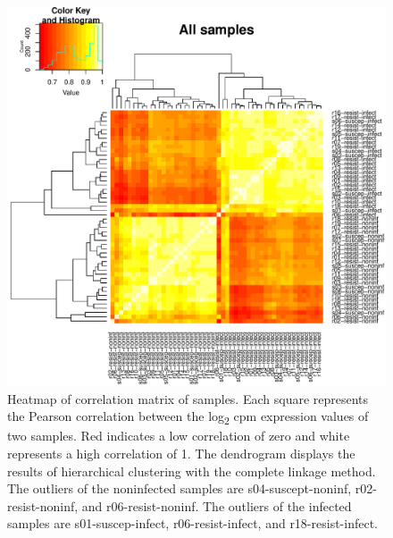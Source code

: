 \documentclass[fleqn,10pt]{wlscirep}
\begin{document}
\begin{figure}[ht]
\centering
\includegraphics[width=\linewidth]{../figure/heatmap-all-samples.pdf}
\caption{
Heatmap of correlation matrix of samples. Each square represents the Pearson correlation between the log\textsubscript{2} cpm expression values of two samples. Red indicates a low correlation of zero and white represents a high correlation of 1. The dendrogram displays the results of hierarchical clustering with the complete linkage method. The outliers of the noninfected samples are s04-suscept-noninf, r02-resist-noninf, and r06-resist-noninf. The outliers of the infected samples are s01-suscep-infect, r06-resist-infect, and r18-resist-infect.
}
\label{fig:heat-all}
\end{figure}
\end{document}
